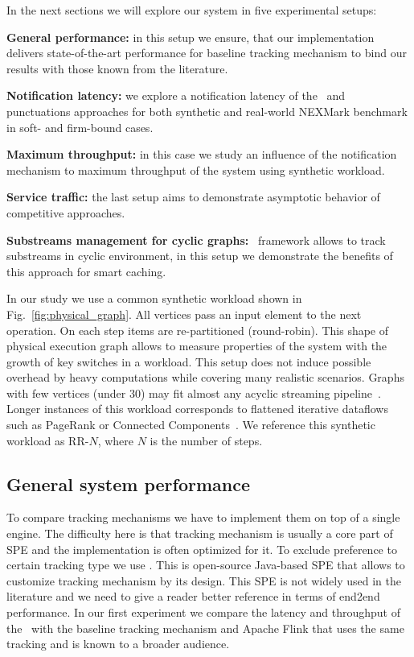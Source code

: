 In the next sections we will explore our system in five experimental setups:
    
    \noindent \textbf{General performance:} in this setup we ensure, that our implementation delivers state-of-the-art performance for baseline tracking mechanism to bind our results with those known from the literature.
    
    \noindent \textbf{Notification latency:} we explore a notification latency of the \tracker\ and punctuations approaches for both synthetic and real-world NEXMark benchmark in soft- and firm-bound cases.
    
    \noindent \textbf{Maximum throughput:} in this case we study an influence of the notification mechanism to maximum throughput of the system using synthetic workload.
    
    \noindent \textbf{Service traffic:} the last setup aims to demonstrate asymptotic behavior of competitive approaches.
    
    \noindent \textbf{Substreams management for cyclic graphs:} \tracker\ framework allows to track substreams in cyclic environment, in this setup we demonstrate the benefits of this approach for smart caching.

In our study we use a common synthetic workload shown in Fig.~\ref{fig:physical_graph}. All vertices pass an input element to the next operation. On each step items are re-partitioned (round-robin). This shape of physical execution graph allows to measure properties of the system with the growth of key switches in a workload. This setup does not induce possible overhead by heavy computations while covering many realistic scenarios. Graphs with few vertices (under 30) may fit almost any acyclic streaming pipeline~\cite{akidau2018streaming}. Longer instances of this workload corresponds to flattened iterative dataflows such as PageRank or Connected Components~\cite{Murray:2013:NTD:2517349.2522738, xu2016efficient}. We reference this synthetic workload as RR-$N$, where $N$ is the number of steps.

\subsection{General system performance}
To compare tracking mechanisms we have to implement them on top of a single engine. The difficulty here is that tracking mechanism is usually a core part of SPE and the implementation is often optimized for it. To exclude preference to certain tracking type we use \FlameStream. This is open-source Java-based SPE that allows to customize tracking mechanism by its design. This SPE is not widely used in the literature and we need to give a reader better reference in terms of end2end performance. In our first experiment we compare the latency and throughput of the \FlameStream\ with the baseline tracking mechanism and Apache Flink that uses the same tracking and is known to a broader audience.

